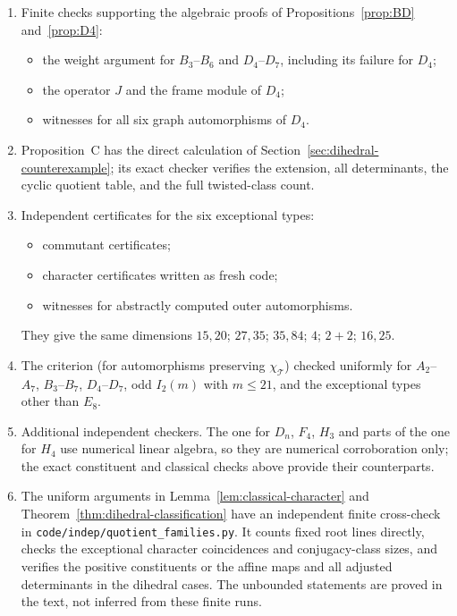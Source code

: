 \documentclass[11pt]{article}
\theoremstyle{definition}
\newcommand{\T}{\mathcal{T}}
\begin{document}
\begin{enumerate}[label=(\arabic*),resume]
\item Finite checks supporting the algebraic proofs of Propositions~\ref{prop:BD} and~\ref{prop:D4}:
\begin{itemize}
\item the weight argument for $B_3$--$B_6$ and $D_4$--$D_7$, including its failure for $D_4$;
\item the operator $J$ and the frame module of $D_4$;
\item witnesses for all six graph automorphisms of $D_4$.
\end{itemize}
\item Proposition~C has the direct calculation of Section~\ref{sec:dihedral-counterexample}; its exact
checker verifies the extension, all determinants, the cyclic quotient table, and the full twisted-class count.

\item Independent certificates for the six exceptional types:
\begin{itemize}
\item commutant certificates;
\item character certificates written as fresh code;
\item witnesses for abstractly computed outer automorphisms.
\end{itemize}
They give the same dimensions $15,20$; $27,35$; $35,84$; $4$; $2+2$; $16,25$.
\item The criterion (for automorphisms preserving $\chi_\T$) checked uniformly for $A_2$--$A_7$, $B_3$--$B_7$,
$D_4$--$D_7$, odd $I_2(m)$ with $m\le21$, and the exceptional types other than $E_8$.
\item Additional independent checkers. The one for $D_n$, $F_4$, $H_3$ and parts of the one
for $H_4$ use numerical linear algebra, so they are numerical corroboration only; the exact constituent and classical checks above provide their counterparts.
\item The uniform arguments in Lemma~\ref{lem:classical-character} and
Theorem~\ref{thm:dihedral-classification} have an independent finite cross-check in
\texttt{code/indep/quotient\_families.py}. It counts fixed root lines directly, checks the exceptional
character coincidences and conjugacy-class sizes, and verifies the positive constituents or the affine maps and all adjusted
determinants in the dihedral cases. The unbounded statements are proved in the text, not inferred
from these finite runs.
\end{enumerate}
\end{document}
